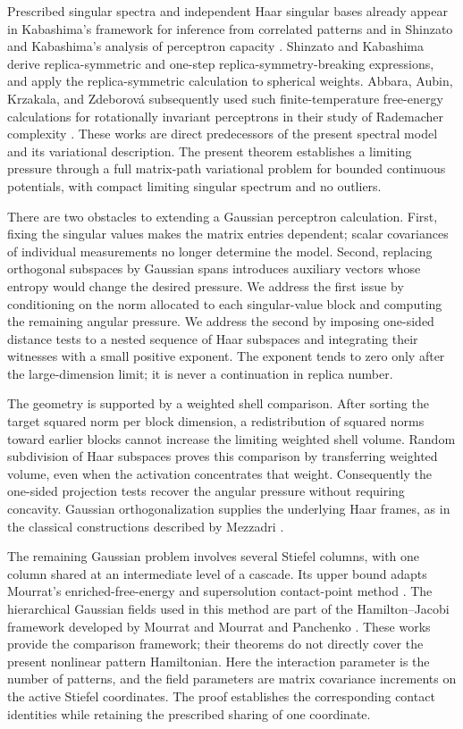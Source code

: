 \documentclass[11pt]{article}
\numberwithin{equation}{section}
\theoremstyle{definition}
\begin{document}
Prescribed singular spectra and independent Haar singular bases already appear in Kabashima's framework for inference from correlated patterns \cite{Kabashima2008} and in Shinzato and Kabashima's analysis of perceptron capacity \cite{ShinzatoKabashima2008}. Shinzato and Kabashima derive replica-symmetric and one-step replica-symmetry-breaking expressions, and apply the replica-symmetric calculation to spherical weights. Abbara, Aubin, Krzakala, and Zdeborov\'a subsequently used such finite-temperature free-energy calculations for rotationally invariant perceptrons in their study of Rademacher complexity \cite[Section~5.5 and Appendix~B.2]{AbbaraEtAl2020}. These works are direct predecessors of the present spectral model and its variational description. The present theorem establishes a limiting pressure through a full matrix-path variational problem for bounded continuous potentials, with compact limiting singular spectrum and no outliers.

There are two obstacles to extending a Gaussian perceptron calculation. First, fixing the singular values makes the matrix entries dependent; scalar covariances of individual measurements no longer determine the model. Second, replacing orthogonal subspaces by Gaussian spans introduces auxiliary vectors whose entropy would change the desired pressure. We address the first issue by conditioning on the norm allocated to each singular-value block and computing the remaining angular pressure. We address the second by imposing one-sided distance tests to a nested sequence of Haar subspaces and integrating their witnesses with a small positive exponent. The exponent tends to zero only after the large-dimension limit; it is never a continuation in replica number.

The geometry is supported by a weighted shell comparison. After sorting the target squared norm per block dimension, a redistribution of squared norms toward earlier blocks cannot increase the limiting weighted shell volume. Random subdivision of Haar subspaces proves this comparison by transferring weighted volume, even when the activation concentrates that weight. Consequently the one-sided projection tests recover the angular pressure without requiring concavity. Gaussian orthogonalization supplies the underlying Haar frames, as in the classical constructions described by Mezzadri \cite{Mezzadri2007}.

The remaining Gaussian problem involves several Stiefel columns, with one column shared at an intermediate level of a cascade. Its upper bound adapts Mourrat's enriched-free-energy and supersolution contact-point method \cite{Mourrat2021,Mourrat2023}. The hierarchical Gaussian fields used in this method are part of the Hamilton--Jacobi framework developed by Mourrat \cite{Mourrat2022} and Mourrat and Panchenko \cite{MourratPanchenko2020}. These works provide the comparison framework; their theorems do not directly cover the present nonlinear pattern Hamiltonian. Here the interaction parameter is the number of patterns, and the field parameters are matrix covariance increments on the active Stiefel coordinates. The proof establishes the corresponding contact identities while retaining the prescribed sharing of one coordinate.
\end{document}
